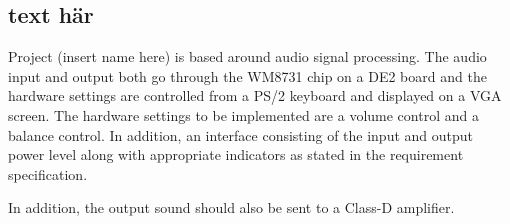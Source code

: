 \subsection{text här} %

Project (insert name here) is based around audio signal processing. The audio input and output both go through the WM8731 chip on a DE2 board and the hardware settings are controlled from a PS/2 keyboard and displayed on a VGA screen. The hardware settings to be implemented are a volume control and a balance control. In addition, an interface consisting of the input and output power level along with appropriate indicators as stated in the requirement specification.

In addition, the output sound should also be sent to a Class-D amplifier.
